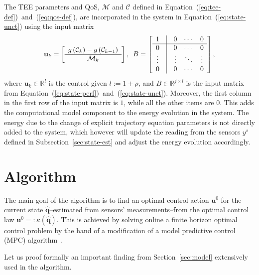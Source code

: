 \documentclass[letterpaper,10pt,conference]{ieeeconf}
\begin{document}
The TEE parameters and QoS, $\mathcal{M}$ and $\mathcal{C}$ defined in Equation~(\ref{eq:tee-def})~and~(\ref{eq:qos-def}), are incorporated in the system in Equation~(\ref{eq:state-unct}) using the input matrix
\begin{equation}
  \mathbf{u}_k=\left[\begin{array}{c}
    g\left(\mathcal{C}_k\right)-g\left(\mathcal{C}_{k-1}\right) \\\hline \mathcal{M}_k
  \end{array}\right],\,\,\,
  B=\left[\begin{array}{ccccccc}
    1 & \vline & 0 & \cdots & 0\\\hline
    0 & \vline & 0 & \cdots & 0\\
    \vdots & \vline & \vdots & \ddots & \vdots\\
    0 & \vline & 0 & \cdots & 0
  \end{array}\right],
\end{equation}
where $\mathbf{u}_k\in\mathbb{R}^l$ is the control given $l:=1+\rho$, and $B\in\mathbb{R}^{j\times l}$ is the input matrix from Equation~(\ref{eq:state-perf})~and~(\ref{eq:state-unct}). Moreover, the first column in the first row of the input matrix is $1$, while all the other items are $0$. This adds the computational model component to the energy evolution in the system. The energy due to the change of explicit trajectory equation parameters is not directly added to the system, which however will update the reading from the sensors $y^s$ defined in Subsection~\ref{sec:state-est} and adjust the energy evolution accordingly.

\section{Algorithm}
\label{sec:algo}

The main goal of the algorithm is to find an optimal control action $\mathbf{u}^0$ for the current state $\hat{\mathbf{q}}$--estimated from sensors' measurements--from the optimal control law $\mathbf{u}^0=:\kappa(\hat{\mathbf{q}})$. This is achieved by solving online a finite horizon optimal control problem by the hand of a modification of a model predictive control (MPC) algorithm~\cite{rawlings2017model}.

Let us proof formally an important finding from Section~\ref{sec:model} extensively used in the algorithm.

\end{document}
